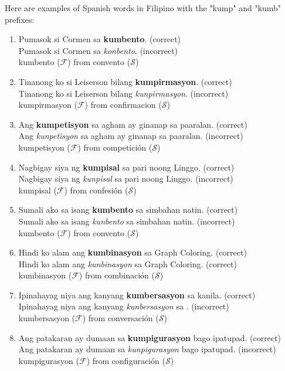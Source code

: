 \begin{example}
    Here are examples of Spanish words in Filipino with the "kump" and "kumb"
    prefixes:
\end{example}
\begin{enumerate}
    \item Pumasok si Cormen sa \textbf{kumbento}. (correct) \\
          Pumasok si Cormen sa \textit{konbento}. (incorrect) \\
          kumbento (\(\mathcal{F}\)) from convento (\(\mathcal{S}\))
    \item Tinanong ko si Leiserson bilang \textbf{kumpirmasyon}. (correct) \\
          Tinanong ko si Leiserson bilang \textit{kunpirmasyon}. (incorrect) \\
          kumpirmasyon (\(\mathcal{F}\)) from confirmacion (\(\mathcal{S}\))
    \item Ang \textbf{kumpetisyon} sa agham ay ginanap sa paaralan. (correct) \\
          Ang \textit{kunpetisyon} sa agham ay ginanap sa paaralan. (incorrect) \\
          kumpetisyon (\(\mathcal{F}\)) from competición (\(\mathcal{S}\))
    \item Nagbigay siya ng \textbf{kumpisal} sa pari noong Linggo. (correct) \\
          Nagbigay siya ng \textit{kunpisal} sa pari noong Linggo. (incorrect) \\
          kumpisal (\(\mathcal{F}\)) from confesión (\(\mathcal{S}\))
    \item Sumali ako sa isang \textbf{kumbento} sa simbahan natin. (correct) \\
          Sumali ako sa isang \textit{kunbento} sa simbahan natin. (incorrect) \\
          kumbento (\(\mathcal{F}\)) from convento (\(\mathcal{S}\))
    \item Hindi ko alam ang \textbf{kumbinasyon} sa Graph Coloring. (correct) \\
          Hindi ko alam ang \textit{kunbinasyon} sa Graph Coloring. (correct) \\
          kumbinasyon (\(\mathcal{F}\)) from combinación (\(\mathcal{S}\))
    \item Ipinahayag niya ang kanyang \textbf{kumbersasyon} sa kanila. (correct) \\
          Ipinahayag niya ang kanyang \textit{kunbersasyon} sa . (incorrect) \\
          kumbersasyon (\(\mathcal{F}\)) from conversación (\(\mathcal{S}\))
    \item Ang patakaran ay dumaan sa \textbf{kumpigurasyon} bago ipatupad. (correct) \\
          Ang patakaran ay dumaan sa \textit{kunpigurasyon} bago ipatupad. (incorrect) \\
          kumpigurasyon (\(\mathcal{F}\)) from configuración (\(\mathcal{S}\))
\end{enumerate}

